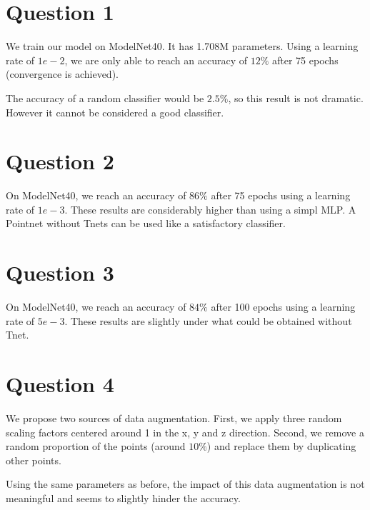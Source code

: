 \documentclass[a4paper]{article}
\begin{document}





\section*{Question 1}

We train our model on ModelNet40. It has 1.708M parameters. Using a learning rate of $1e-2$, we
are only able to reach an accuracy of $12\%$ after 75 epochs (convergence is achieved).

The accuracy of a random classifier would be $2.5\%$, so this result is not dramatic.
However it cannot be considered a good classifier.

\section*{Question 2}
On ModelNet40, we reach an accuracy of $86\%$ after 75 epochs using a learning rate of $1e-3$.
These results are considerably higher than using a simpl MLP. A Pointnet without Tnets can be used
like a satisfactory classifier.

\section*{Question 3}
On ModelNet40, we reach an accuracy of $84\%$ after 100 epochs using a learning rate of $5e-3$.
These results are slightly under what could be obtained without Tnet.

\section*{Question 4}
We propose two sources of data augmentation. First, we apply three random scaling factors centered around 1 in the x, y and z direction. 
Second, we remove a random proportion of the points (around $10\%$) and replace them by duplicating other points.

Using the same parameters as before, the impact of this data augmentation is not meaningful and seems to slightly hinder the accuracy.
\end{document}
